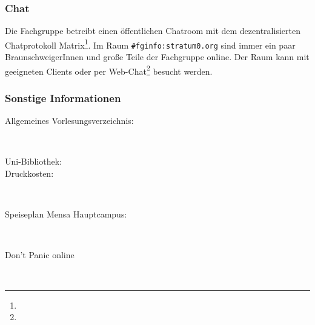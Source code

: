 	\subsubsection*{Chat}
		Die Fachgruppe betreibt einen öffentlichen Chatroom mit dem dezentralisierten Chatprotokoll Matrix\footnote{}. Im Raum \texttt{\#fginfo:stratum0.org} sind immer ein paar BraunschweigerInnen und große Teile der Fachgruppe online. Der Raum kann mit geeigneten Clients oder per Web-Chat\footnote{} besucht werden.





\subsubsection*{Sonstige Informationen}
	\begin{description}
		\item[Allgemeines Vorlesungsverzeichnis:] ~\\
			{\footnotesize{}}
		\item[Uni-Bibliothek:] 
			{\footnotesize{}}
		\item[Druckkosten:] ~\\
			{\footnotesize{}}
		\item[Speiseplan Mensa Hauptcampus:] ~\\
			{\footnotesize{}}
		\item[Don't Panic online] ~\\
			{\footnotesize{}}
	\end{description}
